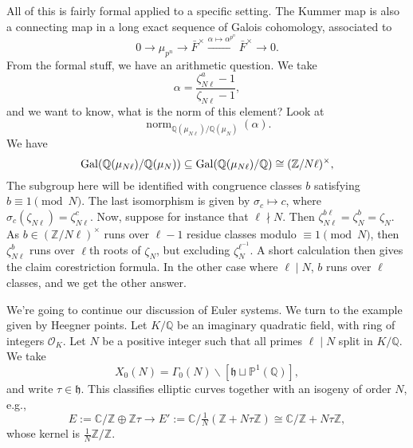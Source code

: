 \documentclass[reqno]{amsart} 
\begin{document}
\begin{remark}
  All of this is fairly formal applied to a specific setting.  The Kummer map is also a connecting map in a long exact sequence of Galois cohomology, associated to
  \begin{equation*}
    0 \rightarrow \mu_{p^n} \rightarrow \bar{F}^\times \xrightarrow{\alpha \mapsto \alpha^{p^n}} \bar{F}^\times \rightarrow 0.
  \end{equation*}
  From the formal stuff, we have an arithmetic question.  We take
  \begin{equation*}
    \alpha = \frac{\zeta_{N \ell}^a - 1}{\zeta_{N \ell} - 1},
  \end{equation*}
  and we want to know, what is the norm of this element?  Look at
  \begin{equation*}
    \operatorname{norm}_{\mathbb{Q}(\mu_{N \ell}) / \mathbb{Q}(\mu_N)}(\alpha).
  \end{equation*}
  We have
  \begin{equation*}
    \operatorname{Gal}(\mathbb{Q}(\mu_{N \ell}) / \mathbb{Q}(\mu_N))
    \subseteq \operatorname{Gal}(\mathbb{Q}(\mu_{N \ell}) / \mathbb{Q})
    \cong(\mathbb{Z} / N \ell)^\times,
  \end{equation*}
  The subgroup here will be identified with congruence classes $b$ satisfying $b \equiv 1 \pmod{N}$.  The last isomorphism is given by $\sigma_c \mapsto c$, where $\sigma_c(\zeta_{N \ell}) = \zeta_{N \ell}^c$.  Now, suppose for instance that $\ell \nmid N$.  Then $\zeta_{N \ell}^{b \ell} = \zeta_N^b = \zeta_N$.  As $b \in(\mathbb{Z} / N \ell )^\times$ runs over $\ell - 1$ residue classes modulo $\equiv 1 \pmod{N}$, then $\zeta_{N \ell}^b$ runs over $\ell$th roots of $\zeta_N$, but excluding $\zeta_N^{\ell^{-1}}$.  A short calculation then gives the claim corestriction formula.  In the other case where $\ell \mid N$, $b$ runs over $\ell$ classes, and we get the other answer.
\end{remark}

We're going to continue our discussion of Euler systems.  We turn to the example given by Heegner points.  Let $K / \mathbb{Q}$ be an imaginary quadratic field, with ring of integers $\mathcal{O}_K$.  Let $N$ be a positive integer such that all primes $\ell \mid N$ split in $K /\mathbb{Q}$.  We take
\begin{equation*}
  X_0(N) = \Gamma_0(N) \backslash[\mathfrak{h} \sqcup \mathbb{P}^1(\mathbb{Q})],
\end{equation*}
and write $\tau \in \mathfrak{h}$.  This classifies elliptic curves together with an isogeny of order $N$, e.g.,
\begin{equation*}
  E := \mathbb{C} / \mathbb{Z} \oplus \mathbb{Z} \tau \rightarrow E' :=  \mathbb{C} / \tfrac{1}{N}(\mathbb{Z} + N \tau \mathbb{Z}) \cong \mathbb{C} / \mathbb{Z} + N \tau \mathbb{Z},
\end{equation*}
whose kernel is $\tfrac{1}{N} \mathbb{Z} / \mathbb{Z}$.
\end{document}
